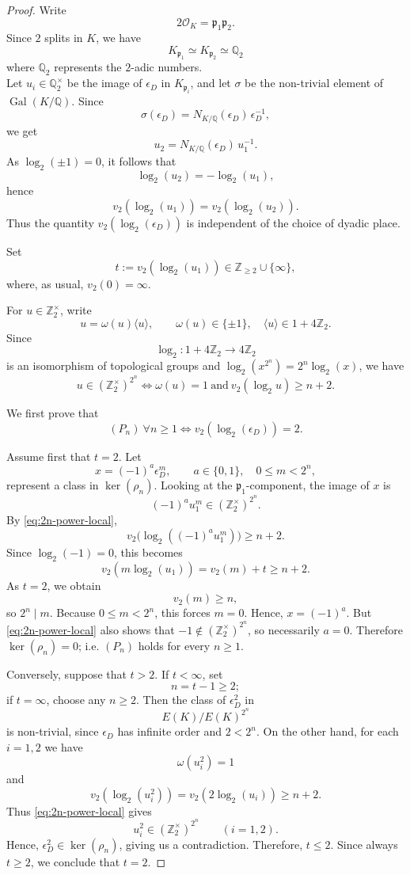 \documentclass[10pt,a4paper]{amsart}
\DeclareMathOperator{\Gal}{Gal}
\newcommand{\Q}{\mathbb{Q}}
\newcommand{\Z}{\mathbb{Z}}
\newcommand{\fk}{\mathfrak }
\begin{document}
\begin{proof}
Write
$$
2\mathcal O_K=\fk p_1\fk p_2.
$$
Since $2$ splits in $K$, we have
$$
K_{\fk p_1}\simeq K_{\fk p_2}\simeq \Q_2
$$ 
where $\Q_2$ represents the $2$-adic numbers.\\

Let $u_i\in \Q_2^\times$ be the image of $\epsilon_D$ in $K_{\fk p_i}$, and let
$\sigma$ be the non-trivial element of $\Gal(K/\mathbb Q)$. Since
$$
\sigma(\epsilon_D)=N_{K/\mathbb Q}(\epsilon_D)\,\epsilon_D^{-1},
$$
we get
$$
u_2=N_{K/\mathbb Q}(\epsilon_D)\,u_1^{-1}.
$$
As $\log_2(\pm 1)=0$, it follows that
$$
\log_2(u_2)=-\log_2(u_1),
$$
hence
$$
v_2(\log_2(u_1))=v_2(\log_2(u_2)).
$$
Thus the quantity $v_2(\log_2(\epsilon_D))$ is independent of the choice of dyadic place.

Set
$$
t:=v_2(\log_2(u_1))\in \Z_{\ge 2}\cup\{\infty\},
$$
where, as usual, $v_2(0)=\infty$.

For $u\in \Z_2^\times$, write
$$
u=\omega(u)\langle u\rangle,
\qquad
\omega(u)\in\{\pm1\},\quad \langle u\rangle\in 1+4\Z_2.
$$
Since
$$
\log_2:1+4\Z_2\longrightarrow 4\Z_2
$$
is an isomorphism of topological groups and $\log_2(x^{2^n})=2^n\log_2(x)$, we have
\begin{equation}\label{eq:2n-power-local}
u\in (\Z_2^\times)^{2^n}
\iff
\omega(u)=1\ \text{and}\ v_2(\log_2 u)\ge n+2.
\end{equation}

We first prove that
$$
(P_n)\ \forall n\ge 1
\iff
v_2(\log_2(\epsilon_D))=2.
$$



Assume first that $t=2$. Let
$$
x=(-1)^a\epsilon_D^m,
\qquad a\in\{0,1\},\quad 0\le m<2^n,
$$
represent a class in $\ker(\rho_n)$. Looking at the $\fk p_1$-component, the image of $x$ is
$$
(-1)^a u_1^m\in (\Z_2^\times)^{2^n}.
$$
By \eqref{eq:2n-power-local},
$$
v_2\!\bigl(\log_2((-1)^a u_1^m)\bigr)\ge n+2.
$$
Since $\log_2(-1)=0$, this becomes
$$
v_2(m\log_2(u_1))=v_2(m)+t\ge n+2.
$$
As $t=2$, we obtain
$$
v_2(m)\ge n,
$$
so $2^n\mid m$. Because $0\le m<2^n$, this forces $m=0$. Hence, $x=(-1)^a$.
But \eqref{eq:2n-power-local} also shows that $-1\notin (\Z_2^\times)^{2^n}$, so necessarily $a=0$.
Therefore $\ker(\rho_n)=0$; i.e. $(P_n)$ holds for every $n\ge 1$.

Conversely, suppose that $t>2$. If $t<\infty$, set
$$
n=t-1\ge 2;
$$
if $t=\infty$, choose any $n\ge 2$. Then the class of $\epsilon_D^2$ in
$$
E(K)/E(K)^{2^n}
$$
is non-trivial, since $\epsilon_D$ has infinite order and $2<2^n$. On the other hand, for each $i=1,2$ we have
$$
\omega(u_i^2)=1
$$
and
$$
v_2(\log_2(u_i^2))
=
v_2(2\log_2(u_i))
\ge n+2.
$$
Thus \eqref{eq:2n-power-local} gives
$$
u_i^2\in (\Z_2^\times)^{2^n}
\qquad (i=1,2).
$$
Hence, $\epsilon_D^2\in \ker(\rho_n)$, giving us a contradiction. Therefore, $t\le 2$.
Since always $t\ge 2$, we conclude that $t=2$.


\end{proof}
\end{document}
